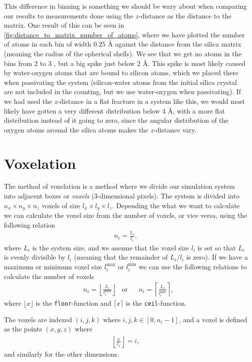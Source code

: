 This difference in binning is something we should be wary about when comparing our results to measurements done using the $z$-distance as the distance to the matrix. One result of this can be seen in \cref{fig:distance_to_matrix_number_of_atoms}, where we have plotted the number of atoms in each bin of width $0.25\text{ \AA}$ against the distance from the silica matrix (meaning the radius of the spherical shells). We see that we get no atoms in the bins from 2 to 3 \Ang, but a big spike just below 2 \AA. This spike is most likely caused by water-oxygen atoms that are bound to silicon atoms, which we placed there when passivating the system (silicon-water atoms from the initial silica crystal are not included in the counting, but we use water-oxygen when passivating). If we had used the $z$-distance in a flat fracture in a system like this, we would most likely have gotten a very different distribution below 4 \AA, with a more flat distribution instead of it going to zero, since the angular distribution of the oxygen atoms around the silica atoms makes the $z$-distance vary.

\section{Voxelation\label{sec:voxelation}}
The method of voxelation is a method where we divide our simulation system into adjacent boxes or \emph{voxels} (3-dimensional pixels). The system is divided into $n_x\times n_y\times n_z$ voxels of size $l_x\times l_y\times l_z$. Depending the what we want to calculate we can calculate the voxel size from the number of voxels, or vice versa, using the following relation
\begin{align*}
    n_i = \frac{L_i}{l_i},
\end{align*}
where $L_i$ is the system size, and we assume that the voxel size $l_i$ is set so that $L_i$ is evenly divisible by $l_i$ (meaning that the remainder of $L_i/l_i$ is zero). If we have a maximum or minimum voxel size $l_i^\text{max}$ or $l_i^\text{min}$ we can use the following relations to calculate the number of voxels
\begin{align*}
    &n_i=\left\lfloor\frac{L_i}{l_i^\text{max}}\right\rfloor &\text{or}& &n_i=\left\lceil\frac{L_i}{l_i^\text{min}}\right\rceil,
\end{align*}
where $\lfloor x \rfloor$ is the \Verb!floor!-function and $\lceil x \rceil$ is the \Verb!ceil!-function.

The voxels are indexed $(i,j,k)$ where $i,j,k \in [0,n_i-1]$, and a voxel is defined as the points $(x,y,z)$ where
\begin{align}
    \left\lfloor\frac{x}{l_x}\right\rfloor = i,\label{eq:find_voxel_index}
\end{align}
and similarly for the other dimensions.

